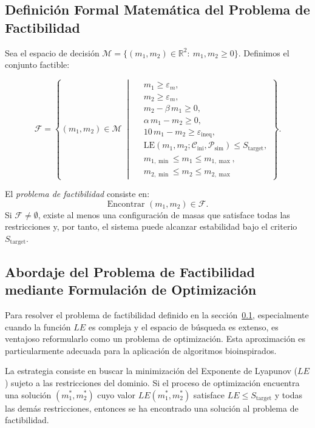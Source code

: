 \subsection{Definición Formal Matemática del Problema de Factibilidad}%
\label{subsec:definicion_formal_factibilidad}

Sea el espacio de decisión \(\mathcal{M} = \{(m_1, m_2) \in \mathbb{R}^2:\ m_1, m_2 \ge 0\}\). Definimos el conjunto factible:

\begin{equation}
\mathcal{F} = \left\{(m_1, m_2) \in \mathcal{M} \;\middle|\;
\begin{aligned}
& m_1 \ge \varepsilon_m, \\
& m_2 \ge \varepsilon_m, \\
& m_2 - \beta\,m_1 \ge 0,  \\
& \alpha\,m_1 - m_2 \ge 0,  \\
& 10\,m_1 - m_2 \ge \varepsilon_{\mathrm{ineq}},  \\
& \mathrm{LE}(m_1,m_2;\mathcal{C}_{\mathrm{ini}},\mathcal{P}_{\mathrm{sim}}) \le S_{\mathrm{target}}, \\
& m_{1,\mathrm{\min}} \le m_1 \le m_{1,\mathrm{\max}}, \\
& m_{2,\mathrm{\min}} \le m_2 \le m_{2,\mathrm{\max}}
\end{aligned}
\right\}.
\end{equation}


El \emph{problema de factibilidad} consiste en:
\[
\text{Encontrar } (m_1,m_2) \in \mathcal{F}.
\]
Si \(\mathcal{F} \neq \emptyset\), existe al menos una configuración de masas que satisface todas las restricciones y, por tanto, el sistema puede alcanzar estabilidad bajo el criterio \(S_{\mathrm{target}}\).

\subsection{Abordaje del Problema de Factibilidad mediante Formulación de Optimización}%
\label{subsec:abordaje_optimizacion}

Para resolver el problema de factibilidad definido en la sección~\ref{subsec:definicion_formal_factibilidad}, especialmente cuando la función $LE$ es compleja y el espacio de búsqueda es extenso, es ventajoso reformularlo como un problema de optimización. Esta aproximación es particularmente adecuada para la aplicación de algoritmos bioinspirados.

La estrategia consiste en buscar la minimización del Exponente de Lyapunov ($LE$) sujeto a las restricciones del dominio. Si el proceso de optimización encuentra una solución $(m_1^*, m_2^*)$ cuyo valor $LE(m_1^*, m_2^*)$ satisface $LE \leq S_{\text{target}}$ y todas las demás restricciones, entonces se ha encontrado una solución al problema de factibilidad.

